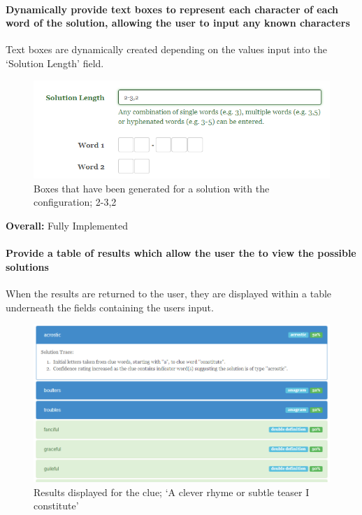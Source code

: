 \paragraph{Dynamically provide text boxes to represent each character of each
word of the solution, allowing the user to input any known characters}

Text boxes are dynamically created depending on the values input into the
`Solution Length' field.

\begin{figure}[H]
	\centering
	\includegraphics[keepaspectratio=true,scale=0.9]{evidence/dynamicboxes.png}
	\caption{Boxes that have been generated for a solution with the configuration;
	2-3,2}
\end{figure}

{\bf Overall:} Fully Implemented


\paragraph{Provide a table of results which allow the user the to view the
possible solutions}

When the results are returned to the user, they are displayed within a table
underneath the fields containing the users input.

\begin{figure}[H]
	\centering
	\includegraphics[keepaspectratio=true,scale=0.6]{evidence/listsolutions.png}
	\caption{Results displayed for the clue; `A clever rhyme or subtle teaser I constitute'}
\end{figure}

